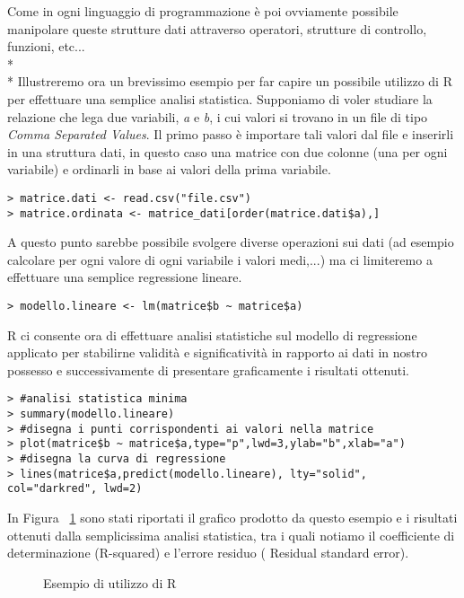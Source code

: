 \documentclass[12pt,a4paper,openright,twoside]{report}
\begin{document}
Come in ogni linguaggio di programmazione è poi ovviamente possibile manipolare queste strutture dati attraverso operatori, strutture di controllo, funzioni, etc...\\* \\*
Illustreremo ora un brevissimo esempio per far capire un possibile utilizzo di R per effettuare una semplice analisi statistica. Supponiamo di voler studiare la relazione che lega due variabili, \emph{a} e \emph{b}, i cui valori si trovano in un file di tipo \emph{Comma Separated Values}. Il primo passo è importare tali valori dal file e inserirli in una struttura dati, in questo caso una matrice con due colonne (una per ogni variabile) e ordinarli in base ai valori della prima variabile.

\lstset{language=R}
\begin{lstlisting}
> matrice.dati <- read.csv("file.csv")
> matrice.ordinata <- matrice_dati[order(matrice.dati$a),]
\end{lstlisting}

A questo punto sarebbe possibile svolgere diverse operazioni sui dati (ad esempio calcolare per ogni valore di ogni variabile i valori medi,...) ma ci limiteremo a effettuare una semplice regressione lineare.
\begin{lstlisting}
> modello.lineare <- lm(matrice$b ~ matrice$a)
\end{lstlisting}

R ci consente ora di effettuare analisi statistiche sul modello di regressione applicato per stabilirne validità e significatività in rapporto ai dati in nostro possesso e successivamente di presentare graficamente i risultati ottenuti.
\begin{lstlisting}
> #analisi statistica minima
> summary(modello.lineare)       
> #disegna i punti corrispondenti ai valori nella matrice
> plot(matrice$b ~ matrice$a,type="p",lwd=3,ylab="b",xlab="a")    
> #disegna la curva di regressione
> lines(matrice$a,predict(modello.lineare), lty="solid", col="darkred", lwd=2)    
\end{lstlisting}


In Figura ~\ref{example_r} sono stati riportati il grafico prodotto da questo esempio e i risultati ottenuti dalla semplicissima analisi statistica, tra i quali notiamo il coefficiente di determinazione (R-squared) e l'errore residuo ( 
Residual standard error).

\begin{figure}[H]
	\centering
	\quad
	\caption{Esempio di utilizzo di R}
	\label{example_r}
\end{figure}
\end{document}
